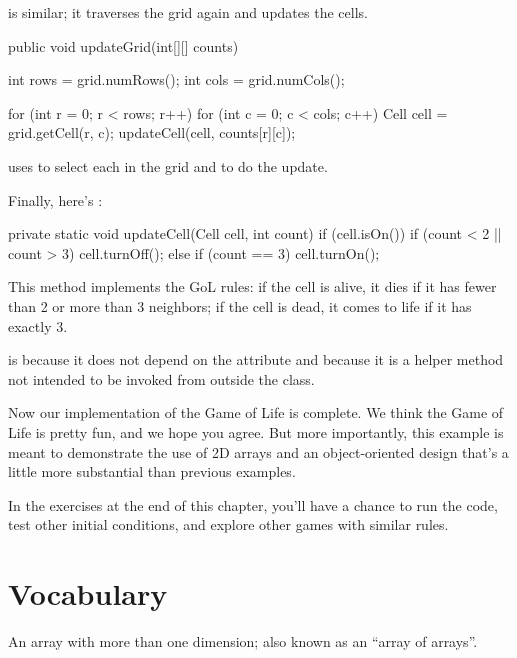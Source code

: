  is similar; it traverses the grid again and updates the cells.

\begin{code}
	public void updateGrid(int[][] counts) {
		int rows = grid.numRows();
        int cols = grid.numCols();

        for (int r = 0; r < rows; r++) {
            for (int c = 0; c < cols; c++) {
                Cell cell = grid.getCell(r, c);
                updateCell(cell, counts[r][c]);
            }
        }
	}
\end{code}

 uses  to select each  in the grid and  to do the update.

Finally, here's :

\begin{code}
private static void updateCell(Cell cell, int count) {
    if (cell.isOn()) {
        if (count < 2 || count > 3) {
            cell.turnOff();
        }
    } else {
        if (count == 3) {
            cell.turnOn();
        }
    }
}
\end{code}

This method implements the GoL rules: if the cell is alive, it dies if it has fewer than 2 or more than 3 neighbors; if the cell is dead, it comes to life if it has exactly 3.

 is  because it does not depend on the  attribute and  because it is a helper method not intended to be invoked from outside the class.

Now our implementation of the Game of Life is complete.
We think the Game of Life is pretty fun, and we hope you agree.
But more importantly, this example is meant to demonstrate the use of 2D arrays and an object-oriented design that's a little more substantial than previous examples.

In the exercises at the end of this chapter, you'll have a chance to run the code, test other initial conditions, and explore other games with similar rules.


\section{Vocabulary}


\begin{description}

An array with more than one dimension; also known as an ``array of arrays''.


\end{description}



